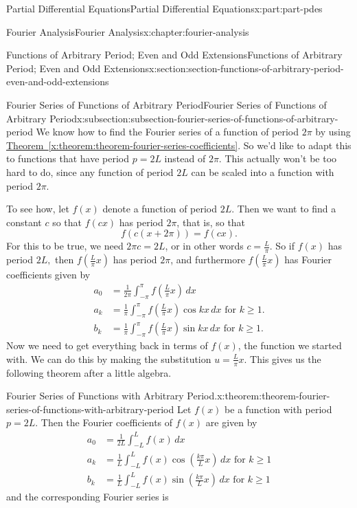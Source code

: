 \documentclass[twoside,10pt,]{book}
\newcommand{\xreffont}{\relax}
\numberwithin{equation}{part}
\newcommand{\amp}{&}
\begin{document}
\begin{partptx}{Partial Differential Equations}{}{Partial Differential Equations}{}{}{x:part:part-pdes}
\begin{chapterptx}{Fourier Analysis}{}{Fourier Analysis}{}{}{x:chapter:fourier-analysis}
\begin{sectionptx}{Functions of Arbitrary Period; Even and Odd Extensions}{}{Functions of Arbitrary Period; Even and Odd Extensions}{}{}{x:section:section-functions-of-arbitrary-period-even-and-odd-extensions}
\begin{subsectionptx}{Fourier Series of Functions of Arbitrary Period}{}{Fourier Series of Functions of Arbitrary Period}{}{}{x:subsection:subsection-fourier-series-of-functions-of-arbitrary-period}
We know how to find the Fourier series of a function of period \(2\pi\) by using \hyperref[x:theorem:theorem-fourier-series-coefficients]{Theorem~{\xreffont\ref{x:theorem:theorem-fourier-series-coefficients}}}. So we'd like to adapt this to functions that have period \(p = 2L\) instead of \(2\pi\). This actually won't be too hard to do, since any function of period \(2L\) can be scaled into a function with period \(2\pi\).%
\par
To see how, let \(f(x)\) denote a function of period \(2L\). Then we want to find a constant \(c\) so that \(f(cx)\) has period \(2\pi\), that is, so that%
\begin{equation*}
f(c(x+2\pi)) = f(cx).
\end{equation*}
For this to be true, we need \(2\pi c = 2L\), or in other words \(c = \frac{L}{\pi}\). So if \(f(x)\) has period \(2L,\) then \(f(\frac{L}{\pi}x)\) has period \(2\pi\), and furthermore \(f(\frac{L}{\pi}x)\) has Fourier coefficients given by%
\begin{align*}
a_{0} \amp= \frac{1}{2\pi}\int_{-\pi}^{\pi}f\left(\frac{L}{\pi}x\right)\,dx\\
a_{k} \amp= \frac{1}{\pi}\int_{-\pi}^{\pi}f\left(\frac{L}{\pi}x\right)\cos kx\,dx\text{ for $k\geq1$.}\\
b_{k} \amp= \frac{1}{\pi}\int_{-\pi}^{\pi}f\left(\frac{L}{\pi}x\right)\sin kx\,dx\text{ for $k\geq1$.}
\end{align*}
Now we need to get everything back in terms of \(f(x)\), the function we started with. We can do this by making the substitution \(u = \frac{L}{\pi}x\). This gives us the following theorem after a little algebra.%
\begin{theorem}{Fourier Series of Functions with Arbitrary Period.}{}{x:theorem:theorem-fourier-series-of-functions-with-arbitrary-period}%
%
Let \(f(x)\) be a function with period \(p = 2L\). Then the Fourier coefficients of \(f(x)\) are given by%
\begin{align*}
a_{0} \amp= \frac{1}{2L}\int_{-L}^{L}f\left(x\right)\,dx\\
a_{k} \amp= \frac{1}{L}\int_{-L}^{L}f\left(x\right)\cos\left(\frac{k\pi}{L}x\right)\,dx\text{ for $k\geq1$}\\
b_{k} \amp= \frac{1}{L}\int_{-L}^{L}f\left(x\right)\sin\left(\frac{k\pi}{L}x\right)\,dx\text{ for $k\geq1$}
\end{align*}
and the corresponding Fourier series is%
\begin{equation*}

\end{equation*}
\end{theorem}
\end{subsectionptx}
\end{sectionptx}
\end{chapterptx}
\end{partptx}
\end{document}
